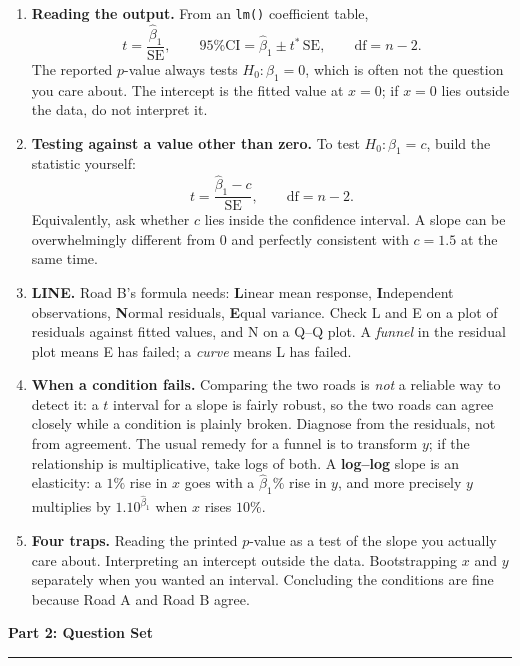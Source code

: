 \documentclass[11pt]{article}
\newcommand{\parttitle}[1]{%
  \par\medskip\noindent
  {\large\bfseries #1}\par
  \vspace{-.5em}\noindent\rule{\linewidth}{0.4pt}\par\smallskip}
\begin{document}
{\begin{enumerate}[label=\textbf{\arabic*.}, wide=0pt, itemsep=.4em, topsep=.5em]
\item \textbf{Reading the output.} From an \texttt{lm()} coefficient table,
\[
t = \frac{\hat\beta_1}{\text{SE}},
\qquad
\text{95\% CI} = \hat\beta_1 \pm t^{\ast}\,\text{SE},
\qquad \text{df} = n-2 .
\]
The reported $p$-value always tests $H_0: \beta_1 = 0$, which is often not the question you care
about. The intercept is the fitted value at $x = 0$; if $x = 0$ lies outside the data, do not
interpret it.

\item \textbf{Testing against a value other than zero.} To test $H_0: \beta_1 = c$, build the
statistic yourself:
\[
t = \frac{\hat\beta_1 - c}{\text{SE}}, \qquad \text{df} = n-2 .
\]
Equivalently, ask whether $c$ lies inside the confidence interval. A slope can be
overwhelmingly different from $0$ and perfectly consistent with $c = 1.5$ at the same time.

\item \textbf{LINE.} Road B's formula needs: \textbf{L}inear mean response, \textbf{I}ndependent
observations, \textbf{N}ormal residuals, \textbf{E}qual variance. Check L and E on a plot of
residuals against fitted values, and N on a Q--Q plot. A \emph{funnel} in the residual plot means E
has failed; a \emph{curve} means L has failed.

\item \textbf{When a condition fails.} Comparing the two roads is \emph{not} a reliable way to
detect it: a $t$ interval for a slope is fairly robust, so the two roads can agree closely while a
condition is plainly broken. Diagnose from the residuals, not from agreement. The usual remedy for
a funnel is to transform $y$; if the relationship is multiplicative, take logs of both. A
\textbf{log--log} slope is an elasticity: a $1\%$ rise in $x$ goes with a $\hat\beta_1\%$ rise in
$y$, and more precisely $y$ multiplies by $1.10^{\hat\beta_1}$ when $x$ rises $10\%$.

\item \textbf{Four traps.} Reading the printed $p$-value as a test of the slope you actually care
about. Interpreting an intercept outside the data. Bootstrapping $x$ and $y$ separately when you
wanted an interval. Concluding the conditions are fine because Road A and Road B agree.

\end{enumerate}

}

\newpage

\parttitle{Part 2: Question Set}
\end{document}
